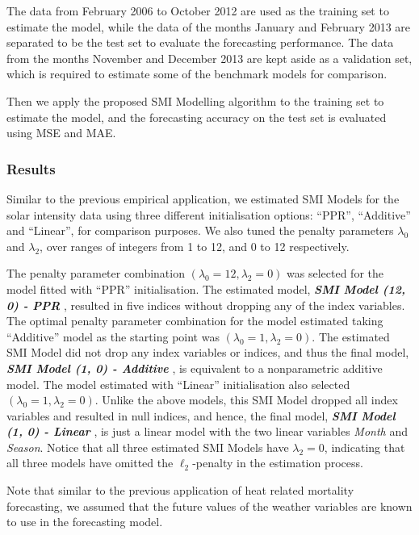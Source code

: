 \documentclass[11pt,a4paper,]{article}
\begin{document}
The data from February 2006 to October 2012 are used as the training set
to estimate the model, while the data of the months January and February
2013 are separated to be the test set to evaluate the forecasting
performance. The data from the months November and December 2013 are
kept aside as a validation set, which is required to estimate some of
the benchmark models for comparison.

Then we apply the proposed SMI Modelling algorithm to the training set
to estimate the model, and the forecasting accuracy on the test set is
evaluated using MSE and MAE.

\hypertarget{results-1}{%
\subsubsection{Results}\label{results-1}}

Similar to the previous empirical application, we estimated SMI Models
for the solar intensity data using three different initialisation
options: ``PPR'', ``Additive'' and ``Linear'', for comparison purposes.
We also tuned the penalty parameters \(\lambda_{0}\) and
\(\lambda_{2}\), over ranges of integers from 1 to 12, and 0 to 12
respectively.

The penalty parameter combination
\((\lambda_{0} = 12, \lambda_{2} = 0)\) was selected for the model
fitted with ``PPR'' initialisation. The estimated model,
\textbf{\emph{SMI Model (12, 0) - PPR }}, resulted in five indices
without dropping any of the index variables. The optimal penalty
parameter combination for the model estimated taking ``Additive'' model
as the starting point was \((\lambda_{0} = 1, \lambda_{2} = 0)\). The
estimated SMI Model did not drop any index variables or indices, and
thus the final model, \textbf{\emph{SMI Model (1, 0) - Additive }}, is
equivalent to a nonparametric additive model. The model estimated with
``Linear'' initialisation also selected
\((\lambda_{0} = 1, \lambda_{2} = 0)\). Unlike the above models, this
SMI Model dropped all index variables and resulted in null indices, and
hence, the final model, \textbf{\emph{SMI Model (1, 0) - Linear }}, is
just a linear model with the two linear variables \emph{Month} and
\emph{Season}. Notice that all three estimated SMI Models have
\(\lambda_{2} = 0\), indicating that all three models have omitted the
\(\ell_{2}\)-penalty in the estimation process.

Note that similar to the previous application of heat related mortality
forecasting, we assumed that the future values of the weather variables
are known to use in the forecasting model.
\end{document}
